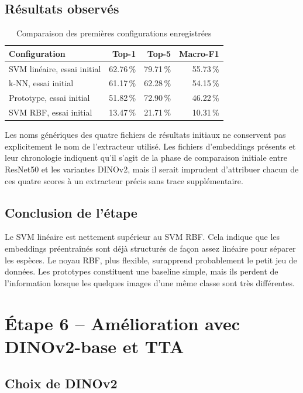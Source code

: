 \documentclass[12pt,a4paper]{report}
\newcommand{\pct}[1]{\num{#1}\,\%}
\begin{document}
\section{Résultats observés}

\begin{table}[H]
\centering
\caption{Comparaison des premières configurations enregistrées}
\begin{tabular}{lrrr}
\toprule
\textbf{Configuration} & \textbf{Top-1} & \textbf{Top-5} & \textbf{Macro-F1}\\
\midrule
SVM linéaire, essai initial & \pct{62,76} & \pct{79,71} & \pct{55,73}\\
k-NN, essai initial & \pct{61,17} & \pct{62,28} & \pct{54,15}\\
Prototype, essai initial & \pct{51,82} & \pct{72,90} & \pct{46,22}\\
SVM RBF, essai initial & \pct{13,47} & \pct{21,71} & \pct{10,31}\\
\bottomrule
\end{tabular}
\end{table}

Les noms génériques des quatre fichiers de résultats initiaux ne conservent pas explicitement le nom de l'extracteur utilisé. Les fichiers d'embeddings présents et leur chronologie indiquent qu'il s'agit de la phase de comparaison initiale entre ResNet50 et les variantes DINOv2, mais il serait imprudent d'attribuer chacun de ces quatre scores à un extracteur précis sans trace supplémentaire.

\section{Conclusion de l'étape}

Le SVM linéaire est nettement supérieur au SVM RBF. Cela indique que les embeddings préentraînés sont déjà structurés de façon assez linéaire pour séparer les espèces. Le noyau RBF, plus flexible, surapprend probablement le petit jeu de données. Les prototypes constituent une baseline simple, mais ils perdent de l'information lorsque les quelques images d'une même classe sont très différentes.

\chapter{Étape 6 -- Amélioration avec DINOv2-base et TTA}

\section{Choix de DINOv2}
\end{document}
